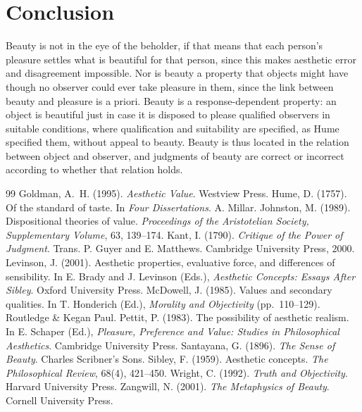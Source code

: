 \documentclass{situationist-preprint}
\begin{document}
\section{Conclusion}

Beauty is not in the eye of the beholder, if that means that each person's pleasure settles what is beautiful for that person, since this makes aesthetic error and disagreement impossible. Nor is beauty a property that objects might have though no observer could ever take pleasure in them, since the link between beauty and pleasure is a priori. Beauty is a response-dependent property: an object is beautiful just in case it is disposed to please qualified observers in suitable conditions, where qualification and suitability are specified, as Hume specified them, without appeal to beauty. Beauty is thus located in the relation between object and observer, and judgments of beauty are correct or incorrect according to whether that relation holds.

\begin{thebibliography}{99}\small
{} Goldman, A.~H. (1995). \emph{Aesthetic Value}. Westview Press.
 Hume, D. (1757). Of the standard of taste. In \emph{Four Dissertations}. A. Millar.
 Johnston, M. (1989). Dispositional theories of value. \emph{Proceedings of the Aristotelian Society, Supplementary Volume}, 63, 139--174.
 Kant, I. (1790). \emph{Critique of the Power of Judgment}. Trans. P. Guyer and E. Matthews. Cambridge University Press, 2000.
 Levinson, J. (2001). Aesthetic properties, evaluative force, and differences of sensibility. In E. Brady and J. Levinson (Eds.), \emph{Aesthetic Concepts: Essays After Sibley}. Oxford University Press.
 McDowell, J. (1985). Values and secondary qualities. In T. Honderich (Ed.), \emph{Morality and Objectivity} (pp.~110--129). Routledge \& Kegan Paul.
 Pettit, P. (1983). The possibility of aesthetic realism. In E. Schaper (Ed.), \emph{Pleasure, Preference and Value: Studies in Philosophical Aesthetics}. Cambridge University Press.
 Santayana, G. (1896). \emph{The Sense of Beauty}. Charles Scribner's Sons.
 Sibley, F. (1959). Aesthetic concepts. \emph{The Philosophical Review}, 68(4), 421--450.
 Wright, C. (1992). \emph{Truth and Objectivity}. Harvard University Press.
 Zangwill, N. (2001). \emph{The Metaphysics of Beauty}. Cornell University Press.
\end{thebibliography}
\end{document}

